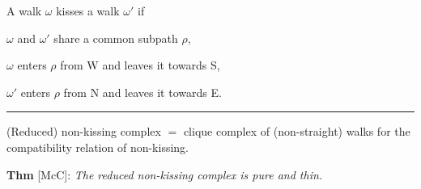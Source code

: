 \documentclass[portrait,final,a0paper,fontscale=0.25]{baposter}
\theoremstyle{definition}
\begin{document}
\begin{poster}
{\smallskip
A walk $\omega$ {\color{green} kisses} a walk $\omega'$ if 
\begin{compactitem}
\item $\omega$ and $\omega'$ share a common subpath $\rho$,
\item $\omega$ enters $\rho$ from W and leaves it towards S,
\item $\omega'$ enters $\rho$ from N and leaves it towards E.
\end{compactitem}

\vspace{-.15cm}
\hspace{-.25cm}
{\color{green} \rule{10.02cm}{1pt}}
\vspace{-.35cm}

{\color{green} (Reduced) non-kissing complex} $=$ clique complex of (non-straight) walks for the compatibility relation of non-kissing.

\smallskip
{\color{green} \bf Thm} [McC]: {\it The reduced non-kissing complex is pure and thin.}

}

\end{poster}
\end{document}
